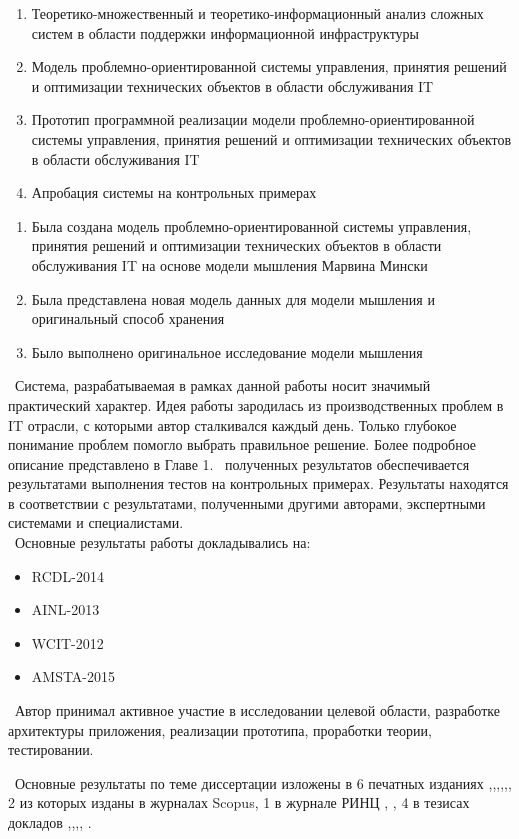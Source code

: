 \begin{enumerate}
  \item Теоретико-множественный и теоретико-информационный анализ сложных систем в области поддержки информационной инфраструктуры
  \item Модель проблемно-ориентированной системы управления, принятия решений и оптимизации технических объектов в области обслуживания IT  
  \item Прототип программной реализации модели проблемно-ориентированной системы управления, принятия решений и оптимизации технических объектов в области обслуживания IT  
  \item Апробация системы на контрольных примерах
\end{enumerate}

\novelty
\begin{enumerate}
  \item Была создана модель проблемно-ориентированной системы управления, принятия решений и оптимизации технических объектов в области обслуживания IT на основе модели мышления Марвина Мински
  \item Была представлена новая модель данных для модели мышления и оригинальный способ хранения 
  \item Было выполнено оригинальное исследование модели мышления 
\end{enumerate}

\influence\ 
Система, разрабатываемая в рамках данной работы носит значимый практический характер. Идея работы зародилась из производственных проблем в IT отрасли, с которыми автор сталкивался каждый день. Только глубокое понимание проблем помогло выбрать правильное решение. Более подробное описание представлено в Главе 1.
\reliability\ полученных результатов обеспечивается результатами выполнения тестов на контрольных примерах. Результаты находятся в соответствии с результатами, полученными другими авторами, экспертными системами и специалистами. \\ 

\probation\
Основные результаты работы докладывались на:
\begin{itemize}
	\item RCDL-2014
	\item AINL-2013
	\item WCIT-2012
	\item AMSTA-2015
\end{itemize}

\contribution\ Автор принимал активное участие в исследовании целевой области, разработке архитектуры приложения, реализации прототипа, проработки теории, тестировании.

\publications\ Основные результаты по теме диссертации изложены в 6 печатных изданиях  \cite{Lobachevskii},\cite{WCIT-2012},\cite{RCDL-2014},\cite{AINL-2013},\cite{ISGZ},\cite{AMSTA-2015}, 
2 из которых изданы в журналах Scopus, 1 в журнале РИНЦ  \cite{ISGZ},
\cite{RCDL-2014}, \cite{AMSTA-2015} 
4 в тезисах докладов \cite{Lobachevskii},\cite{WCIT-2012},\cite{AINL-2013},\cite{ISGZ}, \cite{IJSE-1}.



